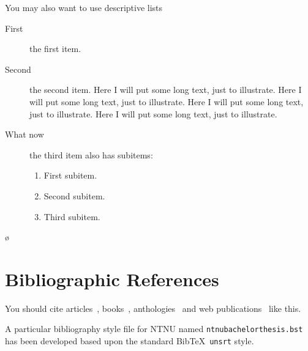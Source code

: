 You may also want to use descriptive lists
\begin{description}
	\item[First] the first item.
	\item[Second] the second item. Here I will put some long text, just to illustrate.
	  Here I will put some long text, just to illustrate. Here I will put
	  some long text, just to illustrate. Here I will put some long text,
	  just to illustrate.
	\item [What now] the third item also has subitems:
	  \begin{enumerate}
		  \item First subitem.
		  \item Second subitem.
		  \item Third subitem.
	  \end{enumerate}
\end{description}
ø


\section{Bibliographic References}

You should cite articles~\cite{Askvall1985}, books~\cite{Card1983},
anthologies~\cite{Lancaster1985} and web publications~\cite{Meldon1997}
like this.


A particular bibliography style file for NTNU named
\texttt{ntnubachelorthesis.bst} has been developed based upon the
standard Bib\TeX\ \texttt{unsrt} style.

